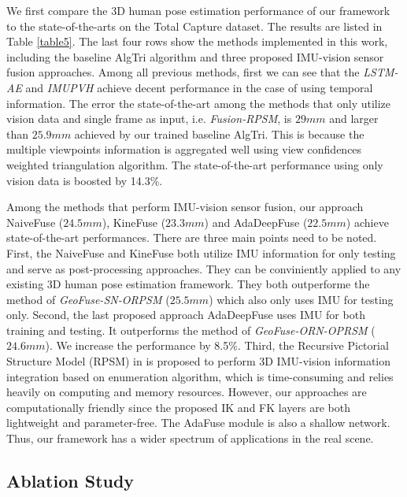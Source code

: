 \documentclass[lettersize,journal]{IEEEtran}
\begin{document}
We first compare the 3D human pose estimation performance of our framework to the state-of-the-arts on the Total Capture dataset. The results are listed in Table \ref{table5}. The last four rows show the methods implemented in this work, including the baseline AlgTri algorithm and three proposed IMU-vision sensor fusion approaches. Among all previous methods, first we can see that the \emph{LSTM-AE}\cite{trumble2018deep} and \emph{IMUPVH}\cite{gilbert2019fusing} achieve decent performance in the case of using temporal information. The error the state-of-the-art among the methods that only utilize vision data and single frame as input, i.e. \emph{Fusion-RPSM}\cite{qiu2019cross}, is $29mm$ and larger than $25.9mm$ achieved by our trained baseline AlgTri. This is because the multiple viewpoints information is aggregated well using view confidences weighted triangulation algorithm. The state-of-the-art performance using only vision data is boosted by 14.3\%. 

Among the methods that perform IMU-vision sensor fusion, our approach NaiveFuse ($24.5mm$), KineFuse ($23.3mm$) and AdaDeepFuse ($22.5mm$) achieve state-of-the-art performances. There are three main points need to be noted. First, the NaiveFuse and KineFuse both utilize IMU information for only testing and serve as post-processing approaches. They can be conviniently applied to any existing 3D human pose estimation framework. They both outperforme the method of \emph{GeoFuse-SN-ORPSM}\cite{zhang2020fusing} ($25.5mm$) which also only uses IMU for testing only. Second, the last proposed approach AdaDeepFuse uses IMU for both training and testing. It outperforms the method of \emph{GeoFuse-ORN-OPRSM}\cite{zhang2020fusing} ($24.6mm$). We increase the performance by 8.5\%. Third, the Recursive Pictorial Structure Model (RPSM) in \cite{zhang2020fusing} is proposed to perform 3D IMU-vision information integration based on enumeration algorithm, which is time-consuming and relies heavily on computing and memory resources. However, our approaches are computationally friendly since the proposed IK and FK layers are both lightweight and parameter-free. The AdaFuse module is also a shallow network. Thus, our framework has a wider spectrum of applications in the real scene.

\subsection{Ablation Study}
\end{document}
